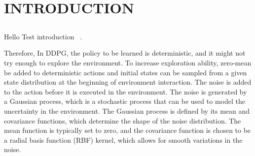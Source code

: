 \section{INTRODUCTION}

\subsection{}

Hello Test introduction~ \cite{Sethian1996}.

Therefore, 
In DDPG, the policy to be learned is deterministic, and it might not try
enough to explore the environment. To increase exploration ability,
zero-mean  be added to deterministic actions and initial
states can be sampled from a given state distribution at the beginning
of environment interaction. The noise is added to the action before it
is executed in the environment. The noise is generated by a Gaussian process,
which is a stochastic process that can be used to model the uncertainty in the environment.
The Gaussian process is defined by its mean and covariance functions,
which determine the shape of the noise distribution. The mean function is typically set to zero,
and the covariance function is chosen to
be a radial basis function (RBF) kernel, which allows for smooth variations in the noise.

